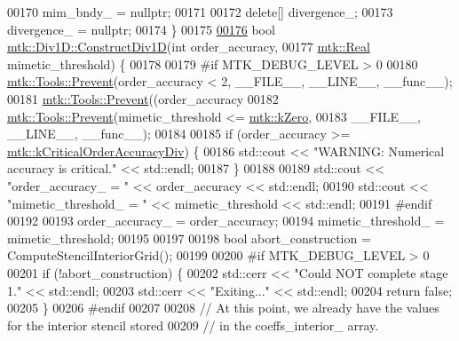 \begin{DoxyCode}
00170   mim\_bndy\_ = \textcolor{keyword}{nullptr};
00171 
00172   \textcolor{keyword}{delete}[] divergence\_;
00173   divergence\_ = \textcolor{keyword}{nullptr};
00174 \}
00175 
\hypertarget{mtk__div__1d_8cc_source_l00176}{}\hyperlink{classmtk_1_1Div1D_a52fcd1542f11e606e36bd188e48bfdf7}{00176} \textcolor{keywordtype}{bool} \hyperlink{classmtk_1_1Div1D_a52fcd1542f11e606e36bd188e48bfdf7}{mtk::Div1D::ConstructDiv1D}(\textcolor{keywordtype}{int} order\_accuracy,
00177                                 \hyperlink{group__c01-roots_gac080bbbf5cbb5502c9f00405f894857d}{mtk::Real} mimetic\_threshold) \{
00178 
00179 \textcolor{preprocessor}{  #if MTK\_DEBUG\_LEVEL > 0}
00180   \hyperlink{classmtk_1_1Tools_a332324c6f25e66be9dff48c5987a3b9f}{mtk::Tools::Prevent}(order\_accuracy < 2, \_\_FILE\_\_, \_\_LINE\_\_, \_\_func\_\_);
00181   \hyperlink{classmtk_1_1Tools_a332324c6f25e66be9dff48c5987a3b9f}{mtk::Tools::Prevent}((order\_accuracy%
00182   \hyperlink{classmtk_1_1Tools_a332324c6f25e66be9dff48c5987a3b9f}{mtk::Tools::Prevent}(mimetic\_threshold <= \hyperlink{group__c01-roots_ga59a451a5fae30d59649bcda274fea271}{mtk::kZero},
00183                       \_\_FILE\_\_, \_\_LINE\_\_, \_\_func\_\_);
00184 
00185   \textcolor{keywordflow}{if} (order\_accuracy >= \hyperlink{group__c01-roots_ga0898eef2108473e44a5223932d571c31}{mtk::kCriticalOrderAccuracyDiv}) \{
00186     std::cout << \textcolor{stringliteral}{"WARNING: Numerical accuracy is critical."} << std::endl;
00187   \}
00188 
00189   std::cout << \textcolor{stringliteral}{"order\_accuracy\_ = "} << order\_accuracy << std::endl;
00190   std::cout << \textcolor{stringliteral}{"mimetic\_threshold\_ = "} << mimetic\_threshold << std::endl;
00191 \textcolor{preprocessor}{  #endif}
00192 
00193   order\_accuracy\_ = order\_accuracy;
00194   mimetic\_threshold\_ = mimetic\_threshold;
00195 
00197 
00198   \textcolor{keywordtype}{bool} abort\_construction = ComputeStencilInteriorGrid();
00199 
00200 \textcolor{preprocessor}{  #if MTK\_DEBUG\_LEVEL > 0}
00201   \textcolor{keywordflow}{if} (!abort\_construction) \{
00202     std::cerr << \textcolor{stringliteral}{"Could NOT complete stage 1."} << std::endl;
00203     std::cerr << \textcolor{stringliteral}{"Exiting..."} << std::endl;
00204     \textcolor{keywordflow}{return} \textcolor{keyword}{false};
00205   \}
00206 \textcolor{preprocessor}{  #endif}
00207 
00208   \textcolor{comment}{// At this point, we already have the values for the interior stencil stored}
00209   \textcolor{comment}{// in the coeffs\_interior\_ array.}

\end{DoxyCode}
